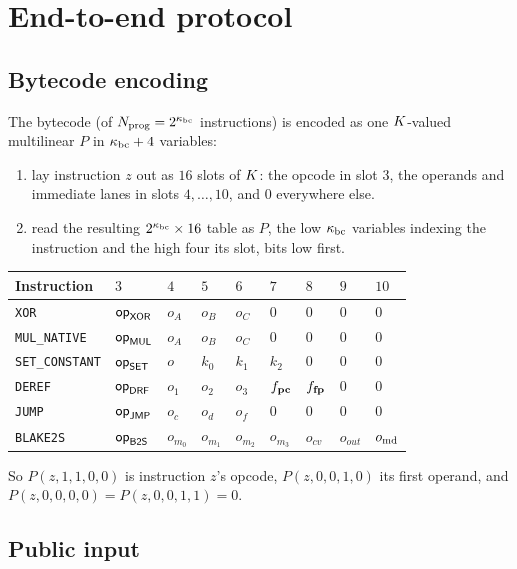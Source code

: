 \section{End-to-end protocol}\label{sec:e2e}

\subsection{Bytecode encoding}\label{sec:e2e-bc}

The bytecode (of $N_{\mathrm{prog}}=2^{\kappa_{\mathrm{bc}}}$ instructions) is encoded as one $K$-valued multilinear $P$ in $\kappa_{\mathrm{bc}}+4$ variables:
\begin{enumerate}[itemsep=1pt,topsep=3pt]
\item lay instruction $z$ out as $16$ slots of $K$: the opcode in slot $3$, the operands and immediate lanes in slots $4,\dots,10$, and $0$ everywhere else.
\item read the resulting $2^{\kappa_{\mathrm{bc}}}\times16$ table as $P$, the low $\kappa_{\mathrm{bc}}$ variables indexing the instruction and the high four its slot, bits low first.
\end{enumerate}
\begin{center}
\begin{tabular}{lllllllll}
\hline
Instruction & $3$ & $4$ & $5$ & $6$ & $7$ & $8$ & $9$ & $10$\\
\hline
\texttt{XOR}           & $\mathsf{op}_{\mathsf{XOR}}$ & $o_A$ & $o_B$ & $o_C$ & $0$ & $0$ & $0$ & $0$\\
\texttt{MUL\_NATIVE}   & $\mathsf{op}_{\mathsf{MUL}}$ & $o_A$ & $o_B$ & $o_C$ & $0$ & $0$ & $0$ & $0$\\
\texttt{SET\_CONSTANT} & $\mathsf{op}_{\mathsf{SET}}$ & $o$   & $k_0$ & $k_1$ & $k_2$ & $0$ & $0$ & $0$\\
\texttt{DEREF}         & $\mathsf{op}_{\mathsf{DRF}}$ & $o_1$ & $o_2$ & $o_3$ & $f_{\mathbf{pc}}$ & $f_{\mathbf{fp}}$ & $0$ & $0$\\
\texttt{JUMP}          & $\mathsf{op}_{\mathsf{JMP}}$ & $o_c$ & $o_d$ & $o_f$ & $0$ & $0$ & $0$ & $0$\\
\texttt{BLAKE2S}        & $\mathsf{op}_{\mathsf{B2S}}$  & $o_{m_0}$ & $o_{m_1}$ & $o_{m_2}$ & $o_{m_3}$ & $o_{\mathit{cv}}$ & $o_{\mathit{out}}$ & $o_{\mathrm{md}}$\\
\hline
\end{tabular}
\end{center}
So $P(z,1,1,0,0)$ is instruction $z$'s opcode, $P(z,0,0,1,0)$ its first operand, and $P(z,0,0,0,0)=P(z,0,0,1,1)=0$.

\subsection{Public input}\label{sec:e2e-pi}

